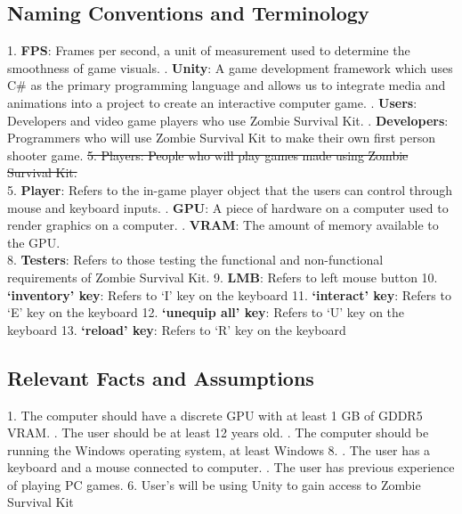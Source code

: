 \documentclass[12pt, titlepage]{article}
\begin{document}
\subsection{Naming Conventions and Terminology} \label{NC}
1. \textbf{FPS}: Frames per second, a unit of measurement used to determine the smoothness of game visuals.
. \textbf{Unity}: A game development framework which uses C\# as the primary programming language and allows us to integrate media and animations into a project to create an interactive computer game. 
. \textbf{Users}: Developers and video game players who use Zombie Survival Kit. 
. \textbf{Developers}: Programmers who will use Zombie Survival Kit to make their own first person shooter game. 
\newline
\sout{5. Players: People who will play games made using Zombie Survival Kit.}\\ 
{\color{magenta} 5. \textbf{Player}: Refers to the in-game player object that the users can control through mouse and keyboard inputs.}
. \textbf{GPU}: A piece of hardware on a computer used to render graphics on a computer. 
. \textbf{VRAM}: The amount of memory available to the GPU. 
\\
{\color{magenta} 8. \textbf{Testers}: Refers to those testing the functional and non-functional requirements of Zombie Survival Kit.}
{\color{magenta} 9. \textbf{LMB}: Refers to left mouse button}
{\color{magenta} 10. \textbf{‘inventory’ key}: Refers to ‘I’ key on the keyboard}
{\color{magenta} 11. \textbf{‘interact’ key}: Refers to ‘E’ key on the keyboard}
{\color{magenta} 12. \textbf{‘unequip all’ key}: Refers to ‘U’ key on the keyboard}
{\color{magenta} 13. \textbf{‘reload’ key}: Refers to ‘R’ key on the keyboard}

\subsection{Relevant Facts and Assumptions}
1. The computer should have a discrete GPU with at least 1 GB of GDDR5 VRAM.
. The user should be at least 12 years old.
. The computer should be running the Windows operating system, at least Windows 8.
. The user has a keyboard and a mouse connected to computer.
. The user has previous experience of playing PC games.
\newline
{\color{magenta} 6. User's will be using Unity to gain access to Zombie Survival Kit}
\end{document}
